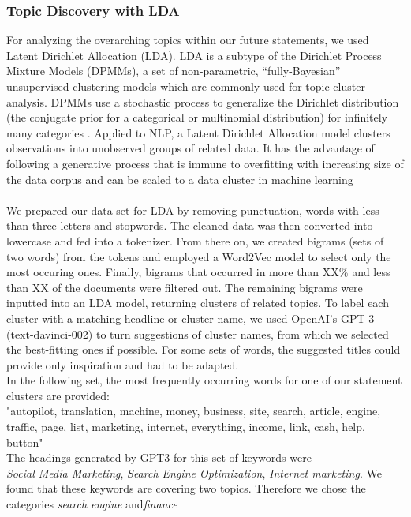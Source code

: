 \subsubsection{Topic Discovery with LDA}
For analyzing the overarching topics within our future statements, we used Latent Dirichlet Allocation (LDA). LDA is a subtype of the Dirichlet Process Mixture Models (DPMMs), a set of non-parametric, “fully-Bayesian” unsupervised clustering models which are commonly used for topic cluster analysis. DPMMs use a stochastic process to generalize the Dirichlet distribution (the conjugate prior for a categorical or multinomial distribution) for infinitely many categories \citep{li2019tutorial}.
Applied to NLP, a Latent Dirichlet Allocation model clusters observations into unobserved groups of related data. It has the advantage of following a generative process that is immune to overfitting with increasing size of the data corpus and can be scaled to a data cluster in machine learning \citep{pritchard2000inference}
\\
\\
We prepared our data set for LDA by removing punctuation, words with less than three letters and stopwords. The cleaned data was then converted into lowercase and fed into a tokenizer. From there on, we created bigrams (sets of two words) from the tokens and employed a Word2Vec model to select only the most occuring ones.
Finally, bigrams that occurred in more than XX\% and less than XX of the documents were filtered out. The remaining bigrams were inputted into an LDA model, returning clusters of related topics. To label each cluster with a matching headline or cluster name, we used OpenAI’s GPT-3 (text-davinci-002) to turn suggestions of cluster names, from which we selected the best-fitting ones if possible.
For some sets of words, the suggested titles could provide only inspiration and had to be adapted.
\\
In the following set, the most frequently occurring words for one of our statement clusters are provided:
\\
"autopilot, translation, machine, money, business, site, search, article, engine, traffic, page, list, marketing, internet, everything, income, link, cash, help, button"
\\
The headings generated by GPT3 for this set of keywords were
\\
\emph{Social Media Marketing}, \emph{Search Engine Optimization}, \emph{Internet marketing}.
We found that these keywords are covering two topics.
Therefore we chose the categories \emph{search engine} and\emph{finance}
